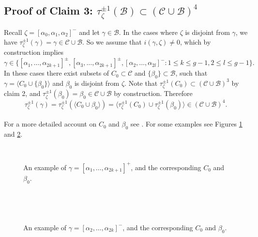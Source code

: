 \documentclass[twoside,11pt,a4paper]{article}
\newcommand*{\Cf}{\mathscr{C}}
\newcommand*{\Bf}{\mathscr{B}}
\begin{document}
\subsection{Proof of Claim 3: $\tau_{\zeta}^{\pm 1}(\Bf) \subset (\Cf \cup \Bf)^{4}$}\label{Chap1Sec4}
\indent Recall $\zeta = [\alpha_{0},\alpha_{1},\alpha_{2}]^{-}$ and let $\gamma \in \Bf$. In the cases where $\zeta$ is disjoint from $\gamma$, we have $\tau_{\zeta}^{\pm 1}(\gamma) = \gamma \in \Cf \cup \Bf$. So we assume that $i(\gamma,\zeta) \neq 0$, which by construction implies $$\gamma \in \{[\alpha_{1}, \ldots, \alpha_{2k+1}]^{\pm},[\alpha_{3}, \ldots, \alpha_{2k+1}]^{\pm}, [\alpha_{2}, \ldots, \alpha_{2l}]^{-}: 1 \leq k \leq g-1, 2 \leq l \leq g-1\}.$$
\indent In these cases there exist subsets of $C_{0} \subset \Cf$ and $\{\beta_{0}\} \subset \Bf$, such that $\gamma = \langle C_{0} \cup \{\beta_{0}\} \rangle$ and $\beta_{0}$ is disjoint from $\zeta$. Note that $\tau_{\zeta}^{\pm 1}(C_{0}) \subset (\Cf \cup \Bf)^{3}$ by claim 2, and $\tau_{\zeta}^{\pm 1}(\beta_{0}) = \beta_{0} \in \Cf \cup \Bf$ by construction. Therefore $$\tau_{\zeta}^{\pm 1}(\gamma) = \tau_{\zeta}^{\pm 1}(\langle C_{0} \cup \beta_{0} \rangle) = \langle \tau_{\zeta}^{\pm 1}(C_{0}) \cup \tau_{\zeta}^{\pm 1}(\beta_{0}) \rangle \in (\Cf \cup \Bf)^{4}.$$\\
\indent For a more detailed account on $C_{0}$ and $\beta_{0}$ see \cite{Thesis}. For some examples see Figures \ref{LastClaimChap1Fig1} and \ref{LastClaimChap1Fig3}.
\begin{figure}[h]
 \begin{center}
  \resizebox{8cm}{!}{}\\[0.3cm]
  \resizebox{8cm}{!}{} \caption{An example of $\gamma = [\alpha_{1}, \ldots, \alpha_{2k+1}]^{+}$, and the corresponding $C_{0}$ and $\beta_{0}$.}\label{LastClaimChap1Fig1}
 \end{center}
\end{figure}\\
\begin{figure}[h]
 \begin{center}
  \resizebox{8cm}{!}{}\\[0.3cm]
  \resizebox{8cm}{!}{} \caption{An example of $\gamma = [\alpha_{2}, \ldots, \alpha_{2k}]^{-}$, and the corresponding $C_{0}$ and $\beta_{0}$.}\label{LastClaimChap1Fig3}
 \end{center}
\end{figure}
\end{document}
